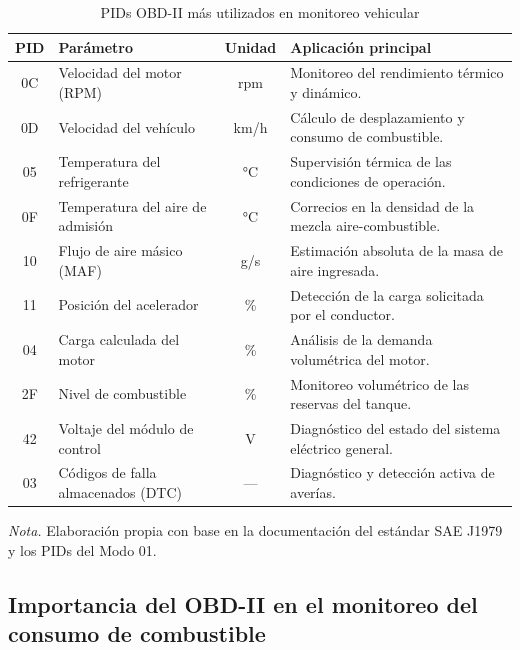 \begin{table}[h]
	\centering
	\captionsetup{labelformat=simple, labelsep=newline, textfont=it, labelfont=bf}
	\caption{PIDs OBD-II más utilizados en monitoreo vehicular}
	\label{tab:PID}
	\vspace{0.3cm}
	
	\begin{tabularx}{\linewidth}{c X c X}
		\toprule 
		\rowcolor[rgb]{0.851, 0.851, 0.851}
		\textbf{PID} & \textbf{Parámetro} & \textbf{Unidad} & \textbf{Aplicación principal} \\
		\midrule 
		0C & Velocidad del motor (RPM) & rpm & Monitoreo del rendimiento térmico y dinámico. \\
		0D & Velocidad del vehículo & km/h & Cálculo de desplazamiento y consumo de combustible. \\
		05 & Temperatura del refrigerante & °C & Supervisión térmica de las condiciones de operación. \\
		0F & Temperatura del aire de admisión & °C & Correcios en la densidad de la mezcla aire-combustible. \\
		10 & Flujo de aire másico (MAF) & g/s & Estimación absoluta de la masa de aire ingresada. \\
		11 & Posición del acelerador & \% & Detección de la carga solicitada por el conductor. \\
		04 & Carga calculada del motor & \% & Análisis de la demanda volumétrica del motor. \\
		2F & Nivel de combustible & \% & Monitoreo volumétrico de las reservas del tanque. \\
		42 & Voltaje del módulo de control & V & Diagnóstico del estado del sistema eléctrico general. \\
		03 & Códigos de falla almacenados (DTC) & --- & Diagnóstico y detección activa de averías. \\
		\bottomrule 
	\end{tabularx}
	\vspace{0.2cm}
	
	\begin{flushleft}
		\footnotesize \textit{Nota.} Elaboración propia con base en la documentación del estándar SAE J1979 y los PIDs del Modo 01.
	\end{flushleft}
\end{table}



\subsection{Importancia del OBD-II en el monitoreo del consumo de combustible}

